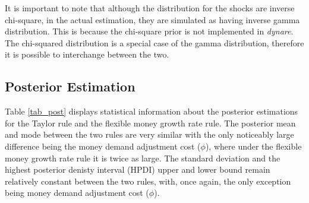 \documentclass[11pt,preprint, authoryear]{elsarticle}
\numberwithin{equation}{section}
\numberwithin{figure}{section}
\numberwithin{table}{section}
\begin{document}
It is important to note that although the distribution for the shocks
are inverse chi-square, in the actual estimation, they are simulated as
having inverse gamma distribution. This is because the chi-square prior
is not implemented in \emph{dynare}. The chi-squared distribution is a
special case of the gamma distribution, therefore it is possible to
interchange between the two.

\hypertarget{posterior-estimation}{%
\subsection{Posterior Estimation}\label{posterior-estimation}}

Table \ref{tab_post} displays statistical information about the
posterior estimations for the Taylor rule and the flexible money growth
rate rule. The posterior mean and mode between the two rules are very
similar with the only noticeably large difference being the money demand
adjustment cost (\(\phi\)), where under the flexible money growth rate
rule it is twice as large. The standard deviation and the highest
posterior denisty interval (HPDI) upper and lower bound remain
relatively constant between the two rules, with, once again, the only
exception being money demand adjustment cost (\(\phi\)).
\end{document}
